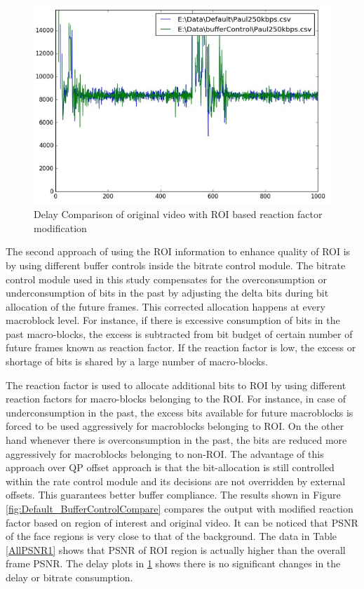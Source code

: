 \documentclass[11pt]{article} %
\begin{document}
\begin{figure}[!h]
	\centering
	\includegraphics[scale=0.75]{BufferControl/Paul250kbps_Buffer_Control_Delay}
	\caption{Delay Comparison of original video with ROI based reaction factor modification}
	\label{fig:DelayDefault_BufferControltCompare}
\end{figure}
The second approach of using the ROI information to enhance quality of ROI is by using different buffer controls inside the bitrate control module. The bitrate control module used in this study compensates for the overconsumption or underconsumption of bits in the past by adjusting the delta bits during bit allocation of the future frames. This corrected allocation happens at every macroblock level. For instance, if there is excessive consumption of bits in the past macro-blocks, the excess is subtracted from bit budget of certain number of future frames known as reaction factor. If the reaction factor is low, the excess or shortage of bits is shared by a large number of macro-blocks.

The reaction factor is used to allocate additional bits to ROI by using different reaction factors for macro-blocks belonging to the ROI. For instance, in case of underconsumption in the past, the excess bits available for future macroblocks is forced to be used aggressively for macroblocks belonging to ROI. On the other hand whenever there is overconsumption in the past, the bits are reduced more aggressively for macroblocks belonging to non-ROI. The advantage of this approach over QP offset approach is that the bit-allocation is still controlled within the rate control module and its decisions are not overridden by external offsets. This guarantees better buffer compliance. The results shown in Figure \ref{fig:Default_BufferControlCompare} compares the output with modified reaction factor based on region of interest and original video. It can be noticed that PSNR of the face regions is very close to that of the background. The data in Table \ref{AllPSNR1} shows that PSNR of ROI region is actually higher than the overall frame PSNR. The delay plots in \ref{fig:DelayDefault_BufferControltCompare} shows there is no significant changes in the delay or bitrate consumption.
\end{document}
